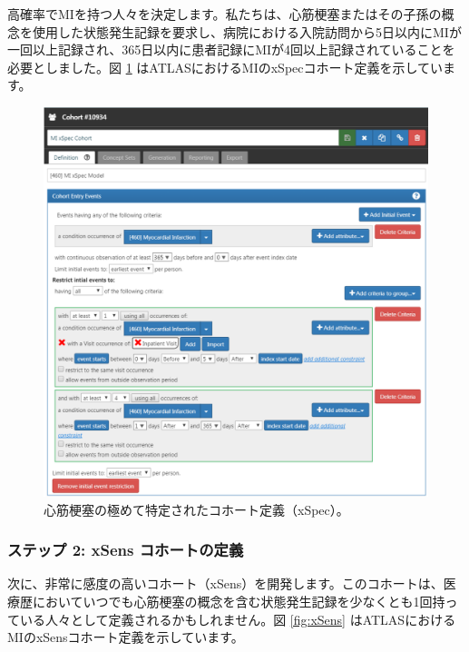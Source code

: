 \documentclass[
  11pt]{book}
\theoremstyle{definition}
\theoremstyle{definition}
\theoremstyle{definition}
\theoremstyle{definition}
\theoremstyle{remark}
\begin{document}
高確率でMIを持つ人々を決定します。私たちは、心筋梗塞またはその子孫の概念を使用した状態発生記録を要求し、病院における入院訪問から5日以内にMIが一回以上記録され、365日以内に患者記録にMIが4回以上記録されていることを必要としました。図 \ref{fig:xSpec} はATLASにおけるMIのxSpecコホート定義を示しています。

\begin{figure}

{\centering \includegraphics[width=1\linewidth]{images/ClinicalValidity/xSpec} 

}

\caption{心筋梗塞の極めて特定されたコホート定義（xSpec）。}\label{fig:xSpec}
\end{figure}

\subsubsection*{ステップ 2: xSens コホートの定義}\label{ux30b9ux30c6ux30c3ux30d7-2-xsens-ux30b3ux30dbux30fcux30c8ux306eux5b9aux7fa9}

次に、非常に感度の高いコホート（xSens）を開発します。このコホートは、医療歴においていつでも心筋梗塞の概念を含む状態発生記録を少なくとも1回持っている人々として定義されるかもしれません。図 \ref{fig:xSens} はATLASにおけるMIのxSensコホート定義を示しています。
\end{document}
